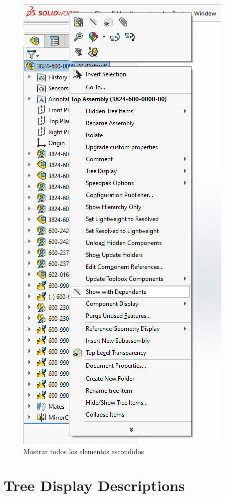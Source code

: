 \documentclass{report}
\begin{document}
\begin{figure}[H]
	\centering
	\includegraphics[width=0.85\linewidth, height=0.75\textheight,keepaspectratio]{Imagenes/solidworks_quickhide_03}
	\caption{Mostrar todos los elementos escondidos}
	\label{fig:solidworksquickhide03}
\end{figure}


\chapter{Tree Display Descriptions}
\end{document}
